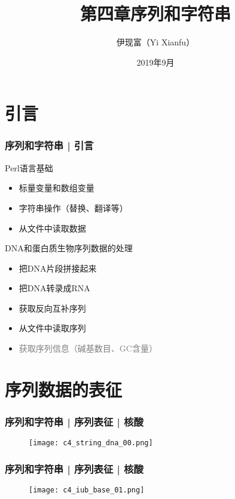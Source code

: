 


\title[序列和字符串]{第四章\quad 序列和字符串}
\author[Yixf]{伊现富（Yi Xianfu）}
\date{2019年9月}




\section{引言}
\begin{frame}
  \frametitle{序列和字符串 | 引言}
  \begin{block}{Perl语言基础}
    \begin{itemize}
      \item 标量变量和数组变量
      \item 字符串操作（替换、翻译等）
      \item 从文件中读取数据
    \end{itemize}
  \end{block}
  \pause
  \begin{block}{DNA和蛋白质生物序列数据的处理}
    \begin{itemize}
      \item 把DNA片段拼接起来
      \item 把DNA转录成RNA
      \item 获取反向互补序列
      \item 从文件中读取序列
      \item \textcolor{gray}{获取序列信息（碱基数目、GC含量）}
    \end{itemize}
  \end{block}
\end{frame}

\section{序列数据的表征}
\begin{frame}
  \frametitle{序列和字符串 | 序列表征 | 核酸}
  \begin{figure}
    \centering
    \texttt{[image: c4\_string\_dna\_00.png]}
  \end{figure}
\end{frame}

\begin{frame}
  \frametitle{序列和字符串 | 序列表征 | 核酸}
  \begin{figure}
    \centering
    \texttt{[image: c4\_iub\_base\_01.png]}
  \end{figure}
\end{frame}

